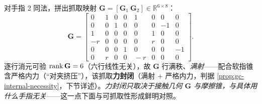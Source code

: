 对手指 2 同法，拼出抓取映射 $\mathbf{G}=[\mathbf{G}_1\ \mathbf{G}_2]\in\mathbb{R}^{6\times8}$：
\begin{equation}
\mathbf{G}=\begin{bmatrix}
0&1&0&0&\ 1&0&0&0\\
0&0&1&0&\ 0&0&-1&0\\
1&0&0&0&\ 0&1&0&0\\
-r&0&0&0&\ 0&r&0&0\\
0&0&0&1&\ 0&0&0&-1\\
0&r&0&0&\ -r&0&0&0
\end{bmatrix}.
\label{eq:gc-scara-G}
\end{equation}
逐行消元可验 $\operatorname{rank}\mathbf{G}=6$（六行线性无关），故 $\mathbf{G}$ 行满秩、\emph{满射}——配合软指锥含严格内力（“对夹挤压”），该抓取\textbf{力封闭}（满射 $+$ 严格内力，判据 \cref{prop:gc-internal-necessity}，下节详述）。\emph{力封闭只取决于接触几何 $\mathbf{G}$ 与摩擦锥，与具体用什么手指无关}——这一点下面与可抓取性形成鲜明对照。


